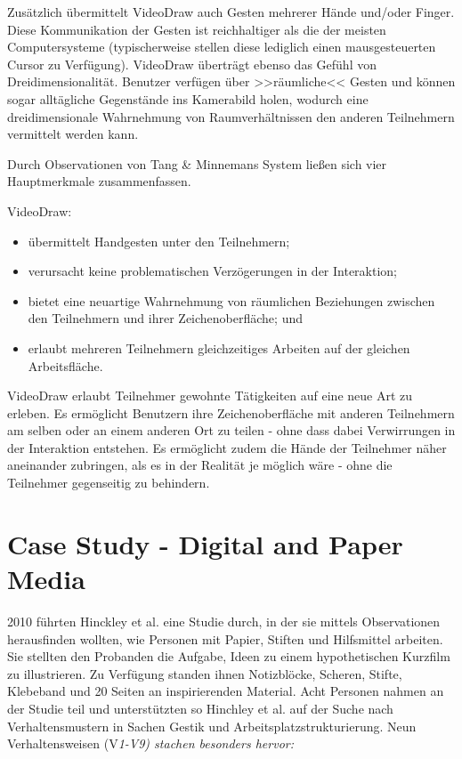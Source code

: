 \newpage Zusätzlich übermittelt VideoDraw auch Gesten mehrerer Hände und/oder Finger. Diese Kommunikation der Gesten ist reichhaltiger als die der meisten Computersysteme (typischerweise stellen diese lediglich einen mausgesteuerten Cursor zu Verfügung). VideoDraw überträgt ebenso das Gefühl von Dreidimensionalität.
Benutzer verfügen über >>räumliche<< Gesten und können sogar alltägliche Gegenstände ins Kamerabild holen, wodurch eine dreidimensionale Wahrnehmung von Raumverhältnissen den anderen Teilnehmern vermittelt werden kann.

\medskip Durch Observationen von Tang \& Minnemans System ließen sich vier Hauptmerkmale zusammenfassen.

\medskip VideoDraw:
\begin{itemize}
	\item übermittelt Handgesten unter den Teilnehmern;
	\item verursacht keine problematischen Verzögerungen in der Interaktion;
	\item bietet eine neuartige Wahrnehmung von räumlichen Beziehungen zwischen den Teilnehmern und ihrer Zeichenoberfläche; und
	\item erlaubt mehreren Teilnehmern gleichzeitiges Arbeiten auf der gleichen Arbeitsfläche.
\end{itemize}

VideoDraw erlaubt Teilnehmer gewohnte Tätigkeiten auf eine neue Art zu erleben. Es ermöglicht Benutzern ihre Zeichenoberfläche mit anderen Teilnehmern am selben oder an einem anderen Ort zu teilen - ohne dass dabei Verwirrungen in der Interaktion entstehen. Es ermöglicht zudem die Hände der Teilnehmer näher aneinander zubringen, als es in der Realität je möglich wäre - ohne die Teilnehmer gegenseitig zu behindern. \citep{Tang:1991p28}

\section{Case Study - Digital and Paper Media}

2010 führten Hinckley et al. eine Studie durch, in der sie mittels Observationen herausfinden wollten, wie Personen mit Papier, Stiften und Hilfsmittel arbeiten. Sie stellten den Probanden die Aufgabe, Ideen zu einem hypothetischen Kurzfilm zu illustrieren. Zu Verfügung standen ihnen Notizblöcke, Scheren, Stifte, Klebeband und 20 Seiten an inspirierenden Material. Acht Personen nahmen an der Studie teil und unterstützten so Hinchley et al. auf der Suche nach Verhaltensmustern in Sachen Gestik und Arbeitsplatzstrukturierung. Neun Verhaltensweisen (V\itshape 1\upshape-V\itshape 9\upshape) stachen besonders hervor:

